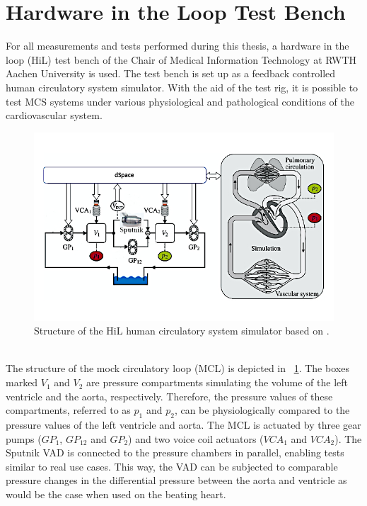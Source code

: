 \section{Hardware in the Loop Test Bench}
For all measurements and tests performed during this thesis, a hardware in the loop (HiL) test bench of the Chair of Medical Information Technology at RWTH Aachen University is used. The test bench is set up as a feedback controlled human circulatory system simulator. With the aid of the test rig, it is possible to test MCS systems under various physiological and pathological conditions of the cardiovascular system.
\begin{figure}[ht]
  \centering
  \includegraphics[width=\textwidth]{images/chapt_4/mock_loop.jpg}
  \caption[HiL test bench]{Structure of the HiL human circulatory system simulator based on \cite{MCL}.}
  \label{fig:mock_loop}
\end{figure}
\\The structure of the mock circulatory loop (MCL) is depicted in \figurename~\ref{fig:mock_loop}. The boxes marked $V_{\mathrm{1}}$ and $V_{\mathrm{2}}$ are pressure compartments simulating the volume of the left ventricle and the aorta, respectively. Therefore, the pressure values of these compartments, referred to as $p_{\mathrm{1}}$ and $p_{\mathrm{2}}$, can be physiologically compared to the pressure values of the left ventricle and aorta. The MCL is actuated by three gear pumps ($GP_{\mathrm{1}}$, $GP_{\mathrm{12}}$ and $GP_{\mathrm{2}}$) and two voice coil actuators ($VCA_{\mathrm{1}}$ and $VCA_{\mathrm{2}}$). The Sputnik VAD is connected to the pressure chambers in parallel, enabling tests similar to real use cases. This way, the VAD can be subjected to comparable pressure changes in the differential pressure between the aorta and ventricle as would be the case when used on the beating heart.
